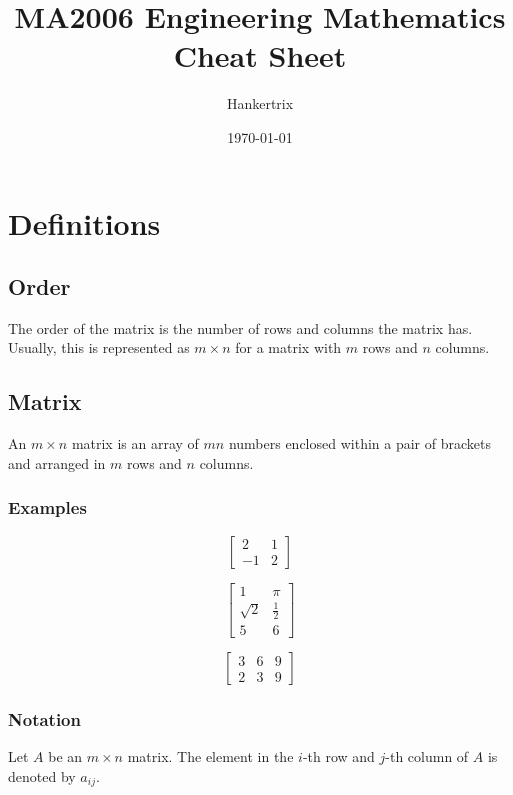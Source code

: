 \documentclass[11pt]{article}
\author{Hankertrix}
\date{\today}
\title{MA2006 Engineering Mathematics Cheat Sheet}
\begin{document}
\maketitle
\setcounter{tocdepth}{2}
\tableofcontents \clearpage
\section{Definitions}
\label{sec:org5299d68}

\subsection{Order}
\label{sec:orgc435643}
The order of the matrix is the number of rows and columns the matrix has. Usually, this is represented as \(m \times n\) for a matrix with \(m\) rows and \(n\) columns.

\subsection{Matrix}
\label{sec:org25fd1f0}
An \(m \times n\) matrix is an array of \(mn\) numbers enclosed within a pair of brackets and arranged in \(m\) rows and \(n\) columns.

\subsubsection{Examples}
\label{sec:orgb682a32}
\begin{displaymath}
\begin{bmatrix}
2 & 1 \\
-1 & 2
\end{bmatrix}
\end{displaymath}

\begin{displaymath}
\begin{bmatrix}
1 & \pi \\
\sqrt{2} & \frac{1}{2} \\
5 & 6
\end{bmatrix}
\end{displaymath}

\begin{displaymath}
\begin{bmatrix}
3 & 6 & 9 \\
2 & 3 & 9
\end{bmatrix}
\end{displaymath}


\subsubsection{Notation}
\label{sec:orgda74762}
Let \(A\) be an \(m \times n\) matrix. The element in the \(i\)-th row and \(j\)-th column of \(A\) is denoted by \(a_{ij}\).
\end{document}
